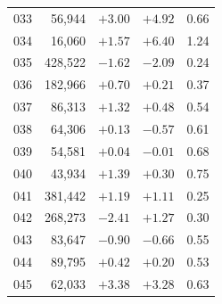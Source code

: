 \begin{tabular}{lrrrr}
033 & 56,944 & $+3.00$ & $+4.92$ & 0.66 \\
034 & 16,060 & $+1.57$ & $+6.40$ & 1.24 \\
035 & 428,522 & $-1.62$ & $-2.09$ & 0.24 \\
036 & 182,966 & $+0.70$ & $+0.21$ & 0.37 \\
037 & 86,313 & $+1.32$ & $+0.48$ & 0.54 \\
038 & 64,306 & $+0.13$ & $-0.57$ & 0.61 \\
039 & 54,581 & $+0.04$ & $-0.01$ & 0.68 \\
040 & 43,934 & $+1.39$ & $+0.30$ & 0.75 \\
041 & 381,442 & $+1.19$ & $+1.11$ & 0.25 \\
042 & 268,273 & $-2.41$ & $+1.27$ & 0.30 \\
043 & 83,647 & $-0.90$ & $-0.66$ & 0.55 \\
044 & 89,795 & $+0.42$ & $+0.20$ & 0.53 \\
045 & 62,033 & $+3.38$ & $+3.28$ & 0.63 \\
\bottomrule
\end{tabular}
